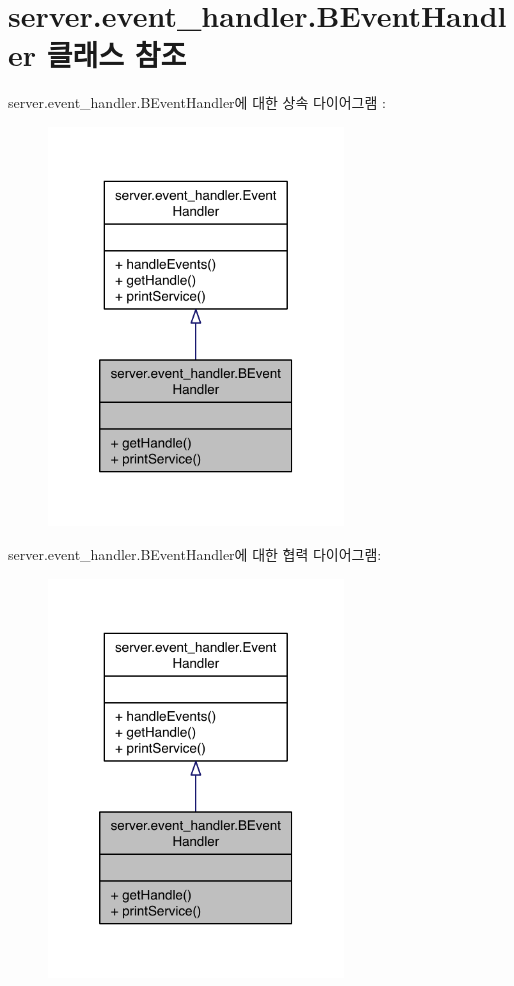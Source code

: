 \hypertarget{classserver_1_1event__handler_1_1_b_event_handler}{\section{server.\-event\-\_\-handler.\-B\-Event\-Handler 클래스 참조}
\label{classserver_1_1event__handler_1_1_b_event_handler}
}


server.\-event\-\_\-handler.\-B\-Event\-Handler에 대한 상속 다이어그램 \-: 
\nopagebreak
\begin{figure}[H]
\begin{center}
\leavevmode
\includegraphics[width=222pt]{classserver_1_1event__handler_1_1_b_event_handler__inherit__graph}
\end{center}
\end{figure}


server.\-event\-\_\-handler.\-B\-Event\-Handler에 대한 협력 다이어그램\-:
\nopagebreak
\begin{figure}[H]
\begin{center}
\leavevmode
\includegraphics[width=222pt]{classserver_1_1event__handler_1_1_b_event_handler__coll__graph}
\end{center}
\end{figure}
